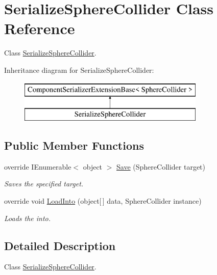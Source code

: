 \hypertarget{class_serialize_sphere_collider}{}\section{Serialize\+Sphere\+Collider Class Reference}
\label{class_serialize_sphere_collider}


Class \hyperlink{class_serialize_sphere_collider}{Serialize\+Sphere\+Collider}.  


Inheritance diagram for Serialize\+Sphere\+Collider\+:\begin{figure}[H]
\begin{center}
\leavevmode
\includegraphics[height=2.000000cm]{class_serialize_sphere_collider}
\end{center}
\end{figure}
\subsection*{Public Member Functions}
\begin{DoxyCompactItemize}
\item 
override I\+Enumerable$<$ object $>$ \hyperlink{class_serialize_sphere_collider_ac3b7c3a6cbd6599135b7d6fbddacbf71}{Save} (Sphere\+Collider target)
\begin{DoxyCompactList}\small\item\em Saves the specified target. \end{DoxyCompactList}\item 
override void \hyperlink{class_serialize_sphere_collider_ad8c33e68733624815a5963c26c62d3e4}{Load\+Into} (object\mbox{[}$\,$\mbox{]} data, Sphere\+Collider instance)
\begin{DoxyCompactList}\small\item\em Loads the into. \end{DoxyCompactList}\end{DoxyCompactItemize}


\subsection{Detailed Description}
Class \hyperlink{class_serialize_sphere_collider}{Serialize\+Sphere\+Collider}. 



